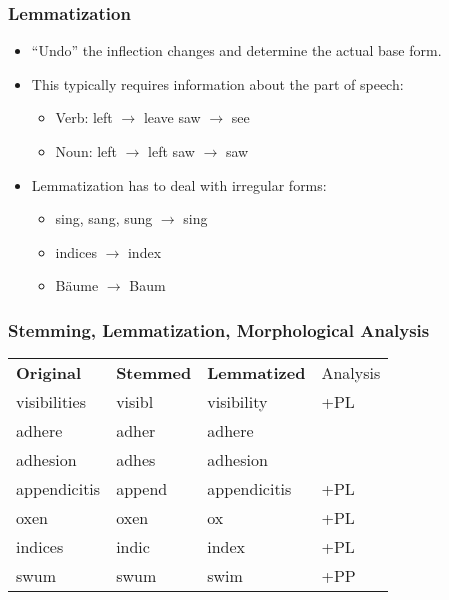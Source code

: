 \documentclass[a4paper, 11pt, accentcolor = tud3b]{tudreport}
\begin{document}
                \subsubsection{Lemmatization} %
                    \begin{itemize}
                    	\item \enquote{Undo} the inflection changes and determine the actual base form.
                    	\item This typically requires information about the part of speech:
                    		\begin{itemize}
                    			\item Verb: \tabto{1.5cm} left \(\rightarrow\) leave \tabto{5cm} saw \(\rightarrow\) see
                    			\item Noun: \tabto{1.5cm} left \(\rightarrow\) left  \tabto{5cm} saw \(\rightarrow\) saw
                    		\end{itemize}
                    	\item Lemmatization has to deal with irregular forms:
                    		\begin{itemize}
                    			\item sing, sang, sung \(\rightarrow\) sing
                    			\item indices \(\rightarrow\) index
                    			\item Bäume \(\rightarrow\) Baum
                    		\end{itemize}
                    \end{itemize}

                \subsubsection{Stemming, Lemmatization, Morphological Analysis} %
	                \begin{table}[H]
	                	\centering
	                	\begin{tabular}{l l l l}
	                		\textbf{Original} & \textbf{Stemmed} & \textbf{Lemmatized} & Analysis \\
	                		visibilities      & visibl           & visibility          & +PL      \\
	                		adhere            & adher            & adhere              &          \\
	                		adhesion          & adhes            & adhesion            &          \\
	                		appendicitis      & append           & appendicitis        & +PL      \\
	                		oxen              & oxen             & ox                  & +PL      \\
	                		indices           & indic            & index               & +PL      \\
	                		swum              & swum             & swim                & +PP
	                	\end{tabular}
	                \end{table}
\end{document}
